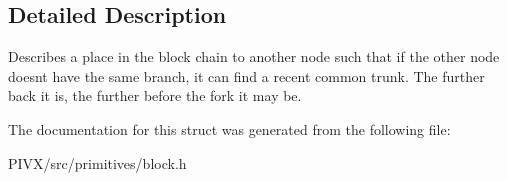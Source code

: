 \subsection{Detailed Description}
Describes a place in the block chain to another node such that if the other node doesn\textquotesingle{}t have the same branch, it can find a recent common trunk. The further back it is, the further before the fork it may be. 

The documentation for this struct was generated from the following file\+:\begin{DoxyCompactItemize}
\item 
P\+I\+V\+X/src/primitives/block.\+h\end{DoxyCompactItemize}
